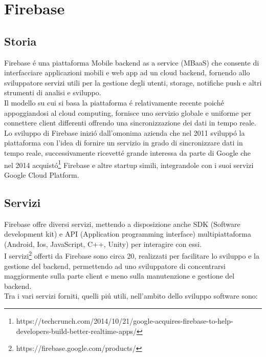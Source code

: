 \chapter{Firebase}                %
\lhead[\fancyplain{}{\bfseries\thepage}]{\fancyplain{}{\bfseries\rightmark}}
\section{Storia}                 %


Firebase \'e una piattaforma Mobile backend as a service (MBaaS) che consente
di interfacciare applicazioni mobili e web app ad un cloud backend, fornendo allo sviluppatore servizi utili per la gestione degli utenti, storage, notifiche push e altri strumenti di analisi e sviluppo.\\
Il modello su cui si basa la piattaforma \'e relativamente recente poich\'e appoggiandosi al cloud computing, fornisce uno servizio globale e uniforme per connettere client differenti offrendo una sincronizzazione dei dati in tempo reale.\\
Lo sviluppo di Firebase inizi\'o dall'omonima azienda che nel 2011 svilupp\'o la piattaforma con l'idea di fornire un servizio in grado di sincronizzare dati in tempo reale, successivamente ricevett\'e grande interessa da parte di Google che nel 2014 acquist\'o\footnote{https://techcrunch.com/2014/10/21/google-acquires-firebase-to-help-developers-build-better-realtime-apps/} Firebase e altre startup simili, integrandole con i suoi servizi Google Cloud Platform.






\section{Servizi}                 %
Firebase offre diversi servizi, mettendo a disposizione anche SDK (Software development kit) e API (Application programming interface) multipiattaforma (Android, Ios, JavaScript, C++, Unity) per interagire con essi.\\
I servizi\footnote{https://firebase.google.com/products/} offerti da Firebase sono circa 20, realizzati per facilitare lo sviluppo e la gestione del backend, permettendo ad uno sviluppatore di concentrarsi maggiormente sulla parte client e meno sulla manutenzione e gestione del backend.\\
Tra i vari servizi forniti, quelli pi\'u utili, nell'ambito dello sviluppo software sono:


